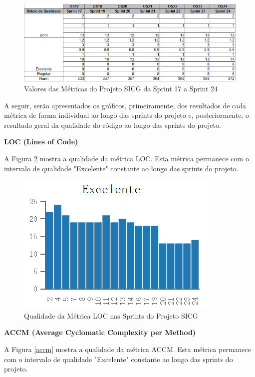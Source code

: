 \begin{figure}[H]
		\centering
			\includegraphics[scale=0.9]{figuras/metricas1724.png}
		\caption{Valores das Métricas do Projeto SICG da Sprint 17 a Sprint 24}
		\label{metricasprint3}
\end{figure}

A seguir, serão apresentados os gráficos, primeiramente, dos resultados de cada métrica de forma individual ao longo das sprints do projeto e, posteriormente, o resultado geral da qualidade do código ao longo das sprints do projeto.

\textbf{LOC (Lines of Code)}

A Figura \ref{loc} mostra a qualidade da métrica LOC. Esta métrica permanece com o intervalo de qualidade "Excelente" constante ao longo das sprints do projeto.

\begin{figure}[H]
		\centering
			\includegraphics[scale=1.0]{figuras/loc.png}
		\caption{Qualidade da Métrica LOC nas Sprints do Projeto SICG}
		\label{loc}
\end{figure}

\textbf{ACCM (Average Cyclomatic Complexity per Method)}

A Figura \ref{accm} mostra a qualidade da métrica ACCM. Esta métrica permanece com o intervalo de qualidade "Excelente" constante ao longo das sprints do projeto.

